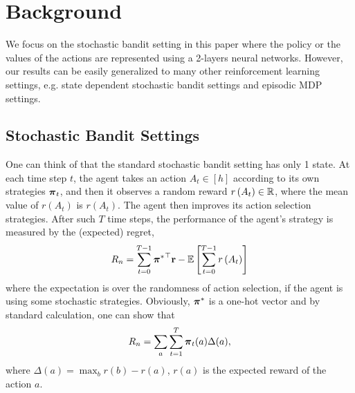 \section{Background}
\label{sec:background}

We focus on the stochastic bandit setting in this paper where the policy or the values of the actions are represented using a 2-layers neural networks.  
However, our results can be easily generalized to many other reinforcement learning settings, e.g. state dependent stochastic bandit settings and episodic MDP settings.

\subsection{Stochastic Bandit Settings}
\label{subsec:settings}

One can think of that the standard stochastic bandit setting has only 1 state.  
At each time step $t$, the agent takes an action $A_t \in [h]$ according to its own strategies ${\boldsymbol{\pi}}_t$, and then it observes a random reward $r\left(A_t\right) \in {\mathbb{R}}$, where the mean value of $r\left(A_t\right)$ is $r\left(A_t\right)$. 
The agent then improves its action selection strategies. 
After such $T$ time steps, the performance of the agent's strategy is measured by the (expected) regret,
\begin{equation}
\label{eq:expected_regret}
R_n = \sum\limits_{t=0}^{T-1}{{{\boldsymbol{\pi}}^*}^\top {\mathbf{r}}} - {\mathbb{E}} \left[ \sum\limits_{t=0}^{T-1}{  r\left(A_t\right)  } \right] 
\end{equation}
where the expectation is over the randomness of action selection, if the agent is using some stochastic strategies.
Obviously, ${\boldsymbol{\pi}}^*$ is a one-hot vector and by standard calculation, one can show that
\[
R_n = \sum_a \sum_{t=1}^T {\boldsymbol{\pi}}_t(a) \Delta(a),
\]
where $\Delta(a) = \max_b r(b)- r(a)$, $r(a)$ is the expected reward of the action $a$.


